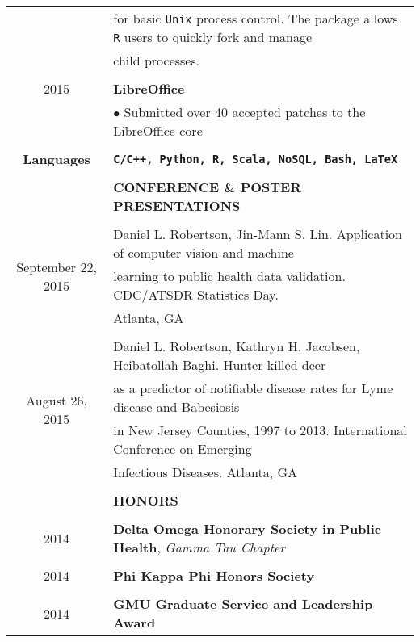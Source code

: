 \documentclass[10pt]{article}
\begin{document}
\begin{table}[ht]
\begin{tabular}{@{\hspace{0mm}}c@{\hspace{1mm}}c@{\hspace{3mm}}cl}
            & & & \hspace*{4mm}for basic \texttt{Unix} process control. The package allows \texttt{R} users to quickly fork and manage\\
            & & & \hspace*{4mm}child processes.\\
            \\
            \multicolumn{3}{c}{2015} & \textbf{LibreOffice}\\
            & & & $\bullet$ Submitted over 40 accepted patches to the LibreOffice core\\
            \\
            \multicolumn{3}{c}{\textbf{Languages}} & \textbf{\texttt{C/C++, Python, R, Scala, NoSQL, Bash, \LaTeX}}\\
            & & & \color{maroon}{\rule{14cm}{0.75pt}}\\
            & & & \large{\textbf{CONFERENCE \& POSTER PRESENTATIONS}}\\
            & & & \color{maroon}{\rule{14cm}{0.75pt}}\\
            \multicolumn{3}{c}{\multirow{3}{*}{September 22, 2015}} & Daniel L. Robertson, Jin-Mann S. Lin. Application of computer vision and machine\\
            & & & learning to public health data validation. CDC/ATSDR Statistics Day.\\
            & & & Atlanta, GA\\
            \\
            \multicolumn{3}{c}{\multirow{4}{*}{August 26, 2015}} & Daniel L. Robertson, Kathryn H. Jacobsen, Heibatollah Baghi. Hunter-killed deer\\
            & & & as a predictor of notifiable disease rates for Lyme disease and Babesiosis\\
            & & & in New Jersey Counties, 1997 to 2013. International Conference on Emerging\\
            & & & Infectious Diseases. Atlanta, GA\\
            & & & \color{maroon}{\rule{14cm}{0.75pt}}\\
            & & & \large{\textbf{HONORS}}\\
            & & & \color{maroon}{\rule{14cm}{0.75pt}}\\
            \multicolumn{3}{c}{2014} & \textbf{Delta Omega Honorary Society in Public Health}, \textit{Gamma Tau Chapter}\\
            \\
            \multicolumn{3}{c}{2014} & \textbf{Phi Kappa Phi Honors Society}\\
            \\
            \multicolumn{3}{c}{2014} & \textbf{GMU Graduate Service and Leadership Award}\\
        \end{tabular}
    \end{table}
\end{document}
